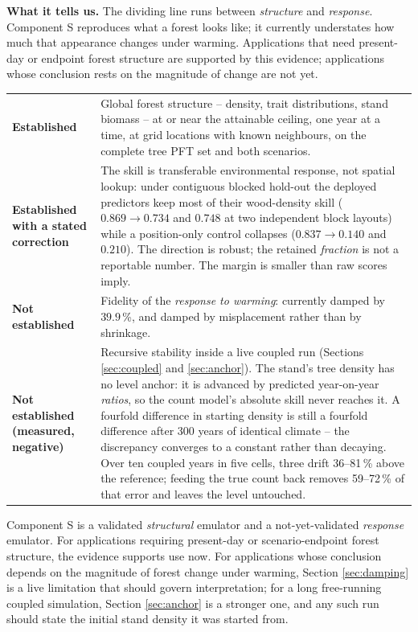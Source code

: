 \documentclass[11pt]{article}
\begin{document}
\begin{table}[h]
{\textbf{What it tells us.} The dividing line runs between \emph{structure} and \emph{response}. Component S reproduces what a forest looks like; it currently understates how much that appearance changes under warming. Applications that need present-day or endpoint forest structure are supported by this evidence; applications whose conclusion rests on the magnitude of change are not yet.}
\label{tab:status}
\small
\begin{tabular}{p{5.6cm}p{9.4cm}}
\toprule
\textbf{Established} & Global forest structure -- density, trait distributions, stand biomass -- at or near the attainable ceiling, one year at a time, at grid locations with known neighbours, on the complete tree PFT set and both scenarios. \\
\addlinespace
\textbf{Established with a stated correction} & The skill is transferable environmental response, not spatial lookup: under contiguous blocked hold-out the deployed predictors keep most of their wood-density skill ($0.869 \rightarrow 0.734$ and $0.748$ at two independent block layouts) while a position-only control collapses ($0.837 \rightarrow 0.140$ and $0.210$). The direction is robust; the retained \emph{fraction} is not a reportable number. The margin is smaller than raw scores imply. \\
\addlinespace
\textbf{Not established} & Fidelity of the \emph{response to warming}: currently damped by $39.9$\,\%, and damped by misplacement rather than by shrinkage. \\
\addlinespace
\textbf{Not established (measured, negative)} & Recursive stability inside a live coupled run (Sections \ref{sec:coupled} and \ref{sec:anchor}). The stand's tree density has no level anchor: it is advanced by predicted year-on-year \emph{ratios}, so the count model's absolute skill never reaches it. A fourfold difference in starting density is still a fourfold difference after 300 years of identical climate -- the discrepancy converges to a constant rather than decaying. Over ten coupled years in five cells, three drift 36--81\,\% above the reference; feeding the true count back removes 59--72\,\% of that error and leaves the level untouched. \\
\bottomrule
\end{tabular}
\end{table}

Component S is a validated \emph{structural} emulator and a not-yet-validated \emph{response} emulator. For applications requiring present-day or scenario-endpoint forest structure, the evidence supports use now. For applications whose conclusion depends on the magnitude of forest change under warming, Section \ref{sec:damping} is a live limitation that should govern interpretation; for a long free-running coupled simulation, Section \ref{sec:anchor} is a stronger one, and any such run should state the initial stand density it was started from.
\end{document}
